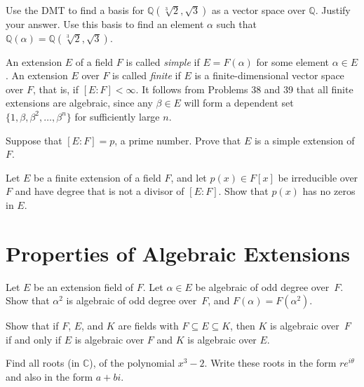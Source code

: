 \begin{problem}
   Use the DMT to find  a basis for $\mathbb{Q}\left(\sqrt[3]{2},\sqrt{3}\right)$ as a vector space over $\mathbb{Q}$.  Justify your answer. Use this basis to find an element $\alpha$ such that $\mathbb{Q}(\alpha) = \mathbb{Q}\left(\sqrt[3]{2},\sqrt{3}\right)$.
\end{problem}



An extension $E$ of a field $F$ is called \textit{simple} if $E=F(\alpha)$ for some element $\alpha \in E$. An extension $E$ over $F$ is called \textit{finite} if $E$ is a finite-dimensional vector space over $F$, that is, if $[E:F]<\infty$. It follows from Problems 38 and 39 that all finite extensions are algebraic, since any $\beta\in E$ will form a dependent set $\{1, \beta, \beta^2, \ldots,\beta^n\}$ for sufficiently large $n$.

\begin{problem}
    Suppose that $[E:F]=p$, a prime number. Prove that $E$ is a simple extension of $F$.
\end{problem}



\begin{problem}
Let $E$ be a finite extension of a field $F$, and let $p(x) \in F[x]$ be irreducible over $F$ and have degree that is not a divisor of $[E:F]$.  Show that $p(x)$ has no zeros in $E$.
\end{problem}



\section{Properties of Algebraic Extensions}

\begin{problem}
Let $E$ be an extension field of $F$.  Let $\alpha \in E$ be algebraic of odd degree over~$F$.  Show that $\alpha^2$ is algebraic of odd degree over~$F$, and $F(\alpha) = F(\alpha^2)$.
\end{problem}



\begin{problem}
Show that if $F$, $E$, and $K$ are fields with $F \subseteq E \subseteq K$, then $K$ is algebraic over~$F$ if and only if $E$ is algebraic over $F$ and $K$ is algebraic over $E$.
\end{problem}



\begin{problem}
    Find all roots (in $\mathbb{C}$), of the polynomial $x^3-2$. Write these roots in the form $re^{i\theta}$ and also in the form $a+bi$.
\end{problem}



